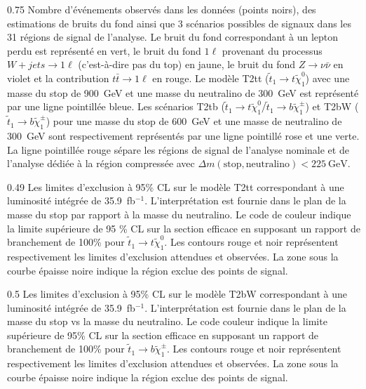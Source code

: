                  {0.75}       %
                 {Nombre d'événements observés dans les données (points noirs), des estimations de bruits du fond ainsi que 3 scénarios possibles de signaux dans les 31 régions de signal de l'analyse. Le bruit du fond correspondant à un lepton perdu est représenté en vert, le bruit du fond  $ 1 \ell $ provenant du processus $ W + jets \to 1 \ell $ (c'est-à-dire pas du top) en jaune, le bruit du fond $ Z \to \nu \bar {\nu} $  en violet et la contribution $ t \bar {t} \to 1 \ell $ en rouge. Le modèle T2tt ($ \tilde{t}_{1} \to t \tilde {\chi}^{0}_{1} $) avec une masse du stop de 900~GeV et une masse du neutralino de 300~GeV est représenté par une ligne pointillée bleue. Les scénarios T2tb ($\tilde{t}_{1} \to t \tilde{\chi}^{0}_{1} /\tilde{t}_{1} \to b \tilde{\chi}^{\pm}_{1}$) et T2bW ($\tilde{t}_{1} \to b \tilde{\chi}^{\pm}_{1} $) pour une masse du stop de 600~GeV et une masse de neutralino de 300~GeV sont respectivement représentés par une ligne pointillé rose et une verte. La ligne pointillée rouge sépare les régions de signal de l'analyse  nominale et de l'analyse dédiée à la région compressée avec $\Delta m\mathrm{(stop, neutralino)<225~GeV}$. }

                 {0.49}       %
                 {Les limites d'exclusion à 95\% CL sur le modèle T2tt correspondant à une luminosité intégrée de 35.9~fb$^{-1}$. L'interprétation est fournie  dans le plan de la masse du stop par rapport à la masse du neutralino. Le code de couleur indique la limite supérieure de 95 \% CL sur la section efficace en supposant un rapport de branchement de 100\% pour $ \tilde {t}_{1} \to t \tilde{\chi}^{0}_{1} $. Les contours rouge et noir représentent respectivement les limites d'exclusion attendues et observées. La zone sous la courbe épaisse noire indique la région exclue des points de signal. }


                 {0.5}       %
                 { Les limites d'exclusion à 95\% CL sur le modèle T2bW correspondant à une luminosité intégrée de 35.9~fb$^{-1}$. L'interprétation est fournie dans le plan de la masse du stop vs la masse du neutralino. Le code couleur indique la limite supérieure de 95\% CL sur la section efficace en supposant un rapport de branchement de 100\% pour $ \tilde{t}_{1} \to b  \tilde{\chi}^{\pm}_{1} $.  Les contours rouge et noir représentent respectivement les limites d'exclusion attendues et observées. La zone sous la courbe épaisse noire indique la région exclue des points de signal. }


